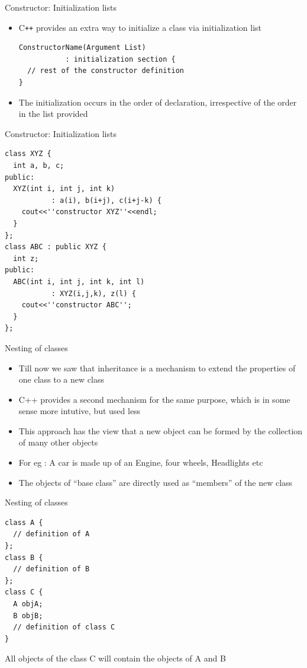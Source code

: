 \documentclass{beamer}
\begin{document}
\begin{frame}[fragile]{Constructor: Initialization lists}
  \begin{itemize}
    \item C\texttt{++} provides an extra way to initialize a class via initialization list\pause
      \begin{lstlisting}
ConstructorName(Argument List) 
           : initialization section {
  // rest of the constructor definition
}
      \end{lstlisting}\pause
    \item The initialization occurs in the order of declaration, irrespective of the order in the list provided
  \end{itemize}
\end{frame}

\begin{frame}[fragile]{Constructor: Initialization lists}
  \begin{lstlisting}
class XYZ {
  int a, b, c;
public:
  XYZ(int i, int j, int k) 
           : a(i), b(i+j), c(i+j-k) {
    cout<<''constructor XYZ''<<endl;
  }
};
class ABC : public XYZ {
  int z;
public:
  ABC(int i, int j, int k, int l) 
           : XYZ(i,j,k), z(l) {
    cout<<''constructor ABC'';
  }
};
  \end{lstlisting}
\end{frame}

\begin{frame}[fragile]{Nesting of classes}
  \begin{itemize}
  \item Till now we saw that inheritance is a mechanism to extend the properties of one class to a new class\pause
  \item C++ provides a second mechanism for the same purpose, which is in some sense more intutive, but used less\pause
  \item This approach has the view that a new object can be formed by the collection of many other objects\pause
  \item For eg : A car is made up of an Engine, four wheels, Headlights etc\pause
  \item The objects of ``base class'' are directly used as ``members'' of the new class
  \end{itemize}
\end{frame}

\begin{frame}[fragile]{Nesting of classes}
  \begin{lstlisting}
class A {
  // definition of A
};
class B {
  // definition of B
};
class C {
  A objA;
  B objB;
  // definition of class C
}
  \end{lstlisting}\pause
  All objects of the class C will contain the objects of A and B
\end{frame}
\end{document}
